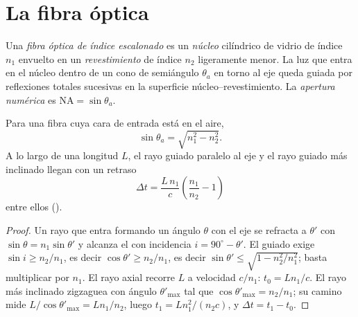 \section{La fibra óptica}

\begin{definition}\label{def:b1:rays-reflection-refraction:fiber}
Una \emph{fibra óptica de índice escalonado} es un \emph{núcleo}
cilíndrico de vidrio de índice $n_1$ envuelto en un \emph{revestimiento}
de índice $n_2$ ligeramente menor. La luz que entra en el núcleo dentro de
un cono de semiángulo $\theta_a$ en torno al eje queda guiada por
reflexiones totales sucesivas en la superficie núcleo--revestimiento. La
\emph{apertura numérica} es $\mathrm{NA} = \sin\theta_a$.
\end{definition}

\begin{proposition}\label{prop:b1:rays-reflection-refraction:fiber}
Para una fibra cuya cara de entrada está en el aire,
\[
\sin\theta_a = \sqrt{n_1^2 - n_2^2} .
\]
A lo largo de una longitud $L$, el rayo guiado paralelo al eje y el rayo
guiado más inclinado llegan con un retraso
\[
\Delta t = \frac{L\,n_1}{c}\left(\frac{n_1}{n_2} - 1\right)
\]
entre ellos (\emph{}).
\end{proposition}

\begin{proof}
Un rayo que entra formando un ángulo $\theta$ con el eje se refracta a
$\theta'$ con $\sin\theta = n_1\sin\theta'$ y alcanza el  con
incidencia $i = 90^\circ - \theta'$. El guiado exige $\sin i \geq n_2/n_1$,
es decir $\cos\theta' \geq n_2/n_1$, es decir $\sin\theta' \leq
\sqrt{1 - n_2^2/n_1^2}$; basta multiplicar por $n_1$. El rayo axial
recorre $L$ a velocidad $c/n_1$: $t_0 = Ln_1/c$. El rayo más inclinado
zigzaguea con ángulo $\theta'_{\max}$ tal que $\cos\theta'_{\max} = n_2/n_1$;
su camino mide $L/\cos\theta'_{\max} = L n_1/n_2$, luego
$t_1 = L n_1^2/(n_2 c)$, y $\Delta t = t_1 - t_0$.
\end{proof}

